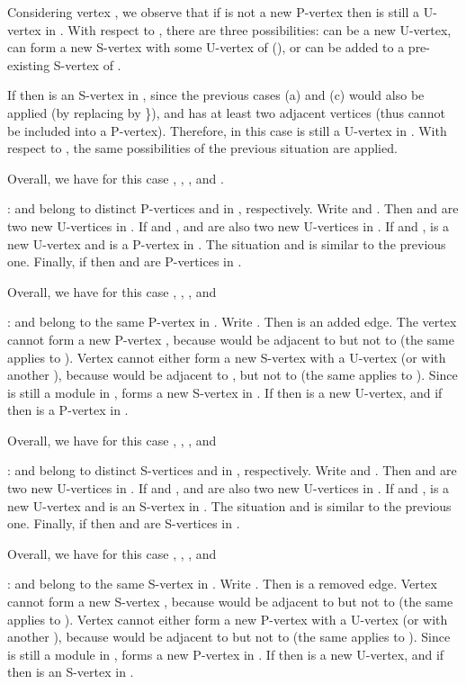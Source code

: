 \documentclass[12pt]{article}
\begin{document}
Considering vertex , we observe that if  is not a new P-vertex then  is still a U-vertex in .
With respect to , there are three possibilities:  can be a new U-vertex,  can form a new S-vertex with some U-vertex  of  (), or  can be added to a pre-existing S-vertex  of .


If  then  is an S-vertex in , since the previous cases (a) and (c) would also be applied (by replacing  by \}), and  has at least two adjacent vertices (thus cannot be included into a P-vertex). Therefore, in this case  is still a U-vertex in . With respect to , the same possibilities  of the previous situation are applied.

Overall, we have for this case
,
,
, and
.

\medskip

:  and  belong to distinct P-vertices
 and  in , respectively.
Write  and . Then  and  are two new U-vertices in . If  and ,  and  are also two new U-vertices in . If  and ,  is a new U-vertex and  is a P-vertex in . The situation  and  is similar to the previous one. Finally, if  then  and  are P-vertices in .

Overall,
we have for this case
,
,
, and


\medskip


:  and  belong to the same P-vertex  in .
Write . Then  is an added edge. The vertex  cannot form a new P-vertex , because  would be adjacent to  but not to  (the same applies to ). Vertex  cannot either form a new S-vertex  with a U-vertex  (or with another ), because  would be adjacent to , but not to  (the same applies to ). Since  is still a module in ,   forms a new S-vertex in . If  then  is a new U-vertex, and if  then  is a P-vertex in .

Overall,
we have for this case
,
,
, and


\medskip

:  and  belong to distinct S-vertices
 and  in , respectively.
Write  and . Then  and  are two new U-vertices in . If  and ,  and  are also two new U-vertices in . If  and ,  is a new U-vertex and  is an S-vertex in . The situation  and  is similar to the previous one. Finally, if  then  and  are S-vertices in .

Overall,
we have for this case
,
,
, and


\medskip

:  and  belong to the same S-vertex  in .
Write . Then  is a removed edge. Vertex  cannot form a new S-vertex , because  would be adjacent to  but not to  (the same applies to ). Vertex  cannot either form a new P-vertex  with a U-vertex  (or with another ), because  would be adjacent to   but not to  (the same applies to ). Since  is still a module in ,   forms a new P-vertex in . If  then  is a new U-vertex, and if  then  is an S-vertex in .
\end{document}

